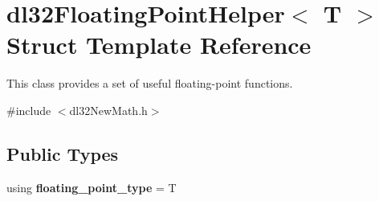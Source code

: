 \hypertarget{structdl32_floating_point_helper}{\section{dl32\-Floating\-Point\-Helper$<$ T $>$ Struct Template Reference}
\label{structdl32_floating_point_helper}
}


This class provides a set of useful floating-\/point functions.  




{\ttfamily \#include $<$dl32\-New\-Math.\-h$>$}

\subsection*{Public Types}
\begin{DoxyCompactItemize}
\item 
\hypertarget{structdl32_floating_point_helper_a3d87dbfbf29b4cffcc46c7494a2e427b}{using {\bfseries floating\-\_\-point\-\_\-type} = T}\label{structdl32_floating_point_helper_a3d87dbfbf29b4cffcc46c7494a2e427b}

\end{DoxyCompactItemize}

